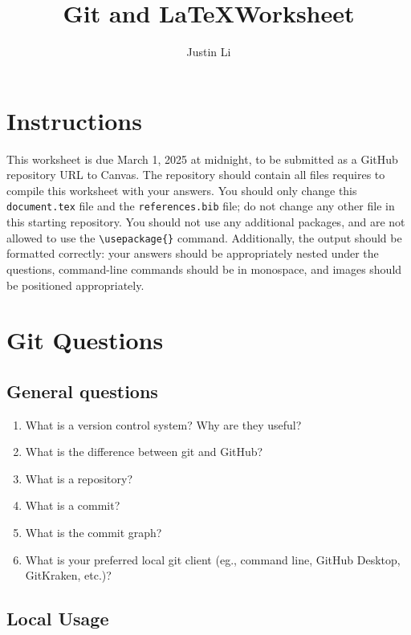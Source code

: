 \documentclass[10pt,twocolumn]{article}
\title{Git and \LaTeX Worksheet}
\author{Justin Li}
\affiliation{Occidental College}
\begin{document}
\maketitle

\section{Instructions}

This worksheet is due March 1, 2025 at midnight, to be submitted as a GitHub repository URL to Canvas. The repository should contain all files requires to compile this worksheet with your answers. You should only change this \texttt{document.tex} file and the  \texttt{references.bib} file; do not change any other file in this starting repository. You should not use any additional packages, and are not allowed to use the \texttt{{\textbackslash}usepackage\{\}} command. Additionally, the output should be formatted correctly: your answers should be appropriately nested under the questions, command-line commands should be in monospace, and images should be positioned appropriately.

\section{Git Questions}

\subsection{General questions}

\begin{enumerate}
    \item What is a version control system? Why are they useful?
    \item What is the difference between git and GitHub?
    \item What is a repository?
    \item What is a commit?
    \item What is the commit graph?
    \item What is your preferred local git client (eg., command line, GitHub Desktop, GitKraken, etc.)?
\end{enumerate}

\subsection{Local Usage}
\end{document}

